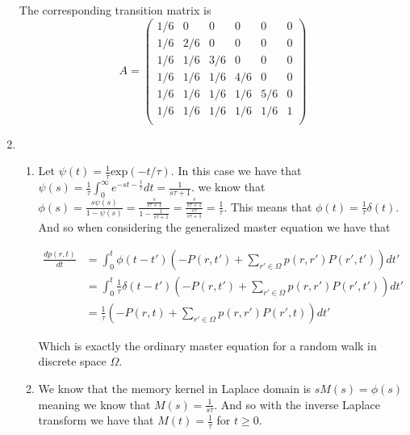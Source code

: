 \documentclass[12pt]{amsart}
\theoremstyle{definition}
\begin{document}
\begin{enumerate}
\begin{center}
\begin{tikzpicture}
        \end{tikzpicture}
        \end{center}
    The corresponding transition matrix is
    $$A=\begin{pmatrix}
    {1}/{6} & 0 & 0 & 0 & 0 & 0\\
    {1}/{6} & {2}/{6} & 0 & 0 & 0 & 0\\
    {1}/{6} & {1}/{6} & {3}/{6} & 0 & 0 & 0\\
    {1}/{6} & {1}/{6} & {1}/{6} & {4}/{6} & 0 & 0\\
    {1}/{6} & {1}/{6} & {1}/{6} & {1}/{6} & {5}/{6} & 0\\
    {1}/{6} & {1}/{6} & {1}/{6} & {1}/{6} & {1}/{6} & 1\\
\end{pmatrix}$$

\item 
\begin{enumerate}[label=(\alph*)]
    \item Let $\psi(t)=\displaystyle{\frac{1}{\tau}\text{exp}(-t/\tau)}$. In this case we have that $\psi(s)=\frac{1}{\tau}\int_{0}^{\infty}e^{-st-\frac{t}{\tau}}dt=\frac{1}{s\tau+1}$. we know that $\phi(s)=\frac{s\psi(s)}{1-\psi(s)}=\frac{\frac{s}{s\tau+1}}{1-\frac{1}{s\tau+1}}=\frac{\frac{s}{s\tau+1}}{\frac{s\tau}{s\tau+1}}=\frac{1}{\tau}$. This means that $\phi(t)=\frac{1}{\tau}\delta(t)$. And so when considering the generalized master equation we have that 

\begin{align*}
    \frac{dp(r,t)}{dt}&=\int_{0}^{t}\phi(t-t')\left(-P(r,t')+\sum_{r'\in \Omega}p(r,r')P(r',t')\right) dt'\\
    &= \int_{0}^{t}\frac{1}{\tau}\delta(t-t')\left(-P(r,t')+\sum_{r'\in \Omega}p(r,r')P(r',t')\right) dt'\\
    &= \frac{1}{\tau}\left(-P(r,t)+\sum_{r'\in \Omega}p(r,r')P(r',t)\right) dt'
\end{align*}

Which is exactly the ordinary master equation for a random walk in discrete space $\Omega$.\\

\item We know that the memory kernel in Laplace domain is $sM(s)=\phi(s)$ meaning we know that $M(s)=\frac{1}{s\tau}$. And so with the inverse Laplace transform we have that $M(t)=\frac{1}{\tau}$ for $t\geq 0$.\\
\end{enumerate}


\end{enumerate}
\end{document}
